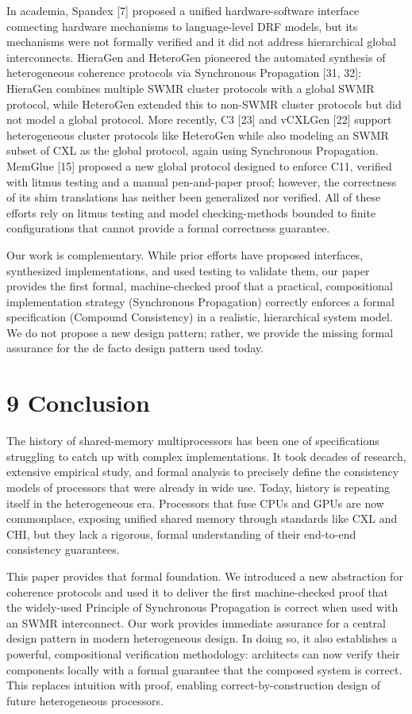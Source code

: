 \documentclass[10pt]{article}
\begin{document}
In academia, Spandex [7] proposed a unified hardware-software interface connecting hardware mechanisms to language-level DRF models, but its mechanisms were not formally verified and it did not address hierarchical global interconnects. HieraGen and HeteroGen pioneered the automated synthesis of heterogeneous coherence protocols via Synchronous Propagation [31, 32]: HieraGen combines multiple SWMR cluster protocols with a global SWMR protocol, while HeteroGen extended this to non-SWMR cluster protocols but did not model a global protocol. More recently, C3 [23] and vCXLGen [22] support heterogeneous cluster protocols like HeteroGen while also modeling an SWMR subset of CXL as the global protocol, again using Synchronous Propagation. MemGlue [15] proposed a new global protocol designed to enforce C11, verified with litmus testing and a manual pen-and-paper proof; however, the correctness of its shim translations has neither been generalized nor verified. All of these efforts rely on litmus testing and model checking-methods bounded to finite configurations that cannot provide a formal correctness guarantee.

Our work is complementary. While prior efforts have proposed interfaces, synthesized implementations, and used testing to validate them, our paper provides the first formal, machine-checked proof that a practical, compositional implementation strategy (Synchronous Propagation) correctly enforces a formal specification (Compound Consistency) in a realistic, hierarchical system model. We do not propose a new design pattern; rather, we provide the missing formal assurance for the de facto design pattern used today.

\section*{9 Conclusion}
The history of shared-memory multiprocessors has been one of specifications struggling to catch up with complex implementations. It took decades of research, extensive empirical study, and formal analysis to precisely define the consistency models of processors that were already in wide use. Today, history is repeating itself in the heterogeneous era. Processors that fuse CPUs and GPUs are now commonplace, exposing unified shared memory through standards like CXL and CHI, but they lack a rigorous, formal understanding of their end-to-end consistency guarantees.

This paper provides that formal foundation. We introduced a new abstraction for coherence protocols and used it to deliver the first machine-checked proof that the widely-used Principle of Synchronous Propagation is correct when used with an SWMR interconnect. Our work provides immediate assurance for a central design pattern in modern heterogeneous design. In doing so, it also establishes a powerful, compositional verification methodology: architects can now verify their components locally with a formal guarantee that the composed system is correct. This replaces intuition with proof, enabling correct-by-construction design of future heterogeneous processors.
\end{document}
